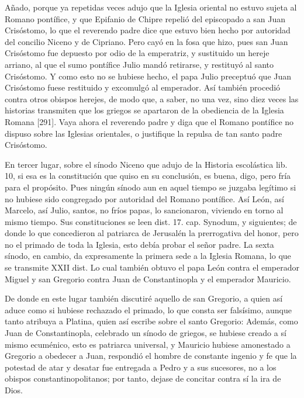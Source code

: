 Añado, porque ya repetidas veces adujo que la Iglesia oriental no estuvo sujeta al Romano pontífice, y que Epifanio de Chipre repelió del episcopado a san Juan Crisóstomo, lo que el reverendo padre dice que estuvo bien hecho por autoridad del concilio Niceno y de Cipriano. Pero cayó en la fosa que hizo, pues san Juan Crisóstomo fue depuesto por odio de la emperatriz, y sustituido un hereje arriano, al que el sumo pontífice Julio mandó retirarse, y restituyó al santo Crisóstomo. Y como esto no se hubiese hecho, el papa Julio preceptuó que Juan Crisóstomo fuese restituido y excomulgó al emperador. Así también procedió contra otros obispos herejes, de modo que, a saber, no una vez, sino diez veces las historias transmiten que los griegos se apartaron de la obediencia de la Iglesia Romana [291]. Vaya ahora el reverendo padre y diga que el Romano pontífice no dispuso sobre las Iglesias orientales, o justifique la repulsa de tan santo padre Crisóstomo.

En tercer lugar, sobre el sínodo Niceno que adujo de la Historia escolástica lib. 10, si esa es la constitución que quiso en su conclusión, es buena, digo, pero fría para el propósito. Pues ningún sínodo aun en aquel tiempo se juzgaba legítimo si no hubiese sido congregado por autoridad del Romano pontífice. Así León, así Marcelo, así Julio, santos, no fríos papas, lo sancionaron, viviendo en torno al mismo tiempo. Sus constituciones se leen dist. 17. cap. Synodum, y siguientes; de donde lo que concedieron al patriarca de Jerusalén la prerrogativa del honor, pero no el primado de toda la Iglesia, esto debía probar el señor padre. La sexta sínodo, en cambio, da expresamente la primera sede a la Iglesia Romana, lo que se transmite XXII dist. Lo cual también obtuvo el papa León contra el emperador Miguel y san Gregorio contra Juan de Constantinopla y el emperador Mauricio.

De donde en este lugar también discutiré aquello de san Gregorio, a quien así aduce como si hubiese rechazado el primado, lo que consta ser falsísimo, aunque tanto atribuya a Platina, quien así escribe sobre el santo Gregorio: Además, como Juan de Constantinopla, celebrado un sínodo de griegos, se hubiese creado a sí mismo ecuménico, esto es patriarca universal, y Mauricio hubiese amonestado a Gregorio a obedecer a Juan, respondió el hombre de constante ingenio y fe que la potestad de atar y desatar fue entregada a Pedro y a sus sucesores, no a los obispos constantinopolitanos; por tanto, dejase de concitar contra sí la ira de Dios.

